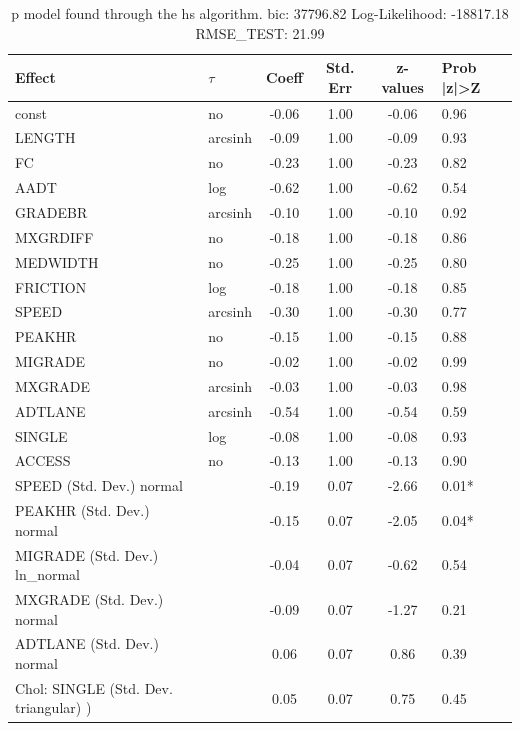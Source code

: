 \begin{table}
	\caption{p model found through the hs algorithm. bic: 37796.82 Log-Likelihood: -18817.18 RMSE_TEST: 21.99}
	\begin{center}
		\begin{tabular}{|l|l|c|c|c|l|}
			\hline
			Effect & $\tau$ & Coeff & Std. Err & z-values & Prob |z|>Z \\
			\hline
			const & no & -0.06 & 1.00 & -0.06 & 0.96 \\
			\hline
			LENGTH & arcsinh & -0.09 & 1.00 & -0.09 & 0.93 \\
			\hline
			FC & no & -0.23 & 1.00 & -0.23 & 0.82 \\
			\hline
			AADT & log & -0.62 & 1.00 & -0.62 & 0.54 \\
			\hline
			GRADEBR & arcsinh & -0.10 & 1.00 & -0.10 & 0.92 \\
			\hline
			MXGRDIFF & no & -0.18 & 1.00 & -0.18 & 0.86 \\
			\hline
			MEDWIDTH & no & -0.25 & 1.00 & -0.25 & 0.80 \\
			\hline
			FRICTION & log & -0.18 & 1.00 & -0.18 & 0.85 \\
			\hline
			SPEED & arcsinh & -0.30 & 1.00 & -0.30 & 0.77 \\
			\hline
			PEAKHR & no & -0.15 & 1.00 & -0.15 & 0.88 \\
			\hline
			MIGRADE & no & -0.02 & 1.00 & -0.02 & 0.99 \\
			\hline
			MXGRADE & arcsinh & -0.03 & 1.00 & -0.03 & 0.98 \\
			\hline
			ADTLANE & arcsinh & -0.54 & 1.00 & -0.54 & 0.59 \\
			\hline
			SINGLE & log & -0.08 & 1.00 & -0.08 & 0.93 \\
			\hline
			ACCESS & no & -0.13 & 1.00 & -0.13 & 0.90 \\
			\hline
			SPEED (Std. Dev.) normal &  & -0.19 & 0.07 & -2.66 & 0.01* \\
			\hline
			PEAKHR (Std. Dev.) normal &  & -0.15 & 0.07 & -2.05 & 0.04* \\
			\hline
			MIGRADE (Std. Dev.) ln_normal &  & -0.04 & 0.07 & -0.62 & 0.54 \\
			\hline
			MXGRADE (Std. Dev.) normal &  & -0.09 & 0.07 & -1.27 & 0.21 \\
			\hline
			ADTLANE (Std. Dev.) normal &  & 0.06 & 0.07 & 0.86 & 0.39 \\
			\hline
			 Chol: SINGLE (Std. Dev. triangular) ) &  & 0.05 & 0.07 & 0.75 & 0.45 \\

\end{tabular}
\end{center}
\end{table}
